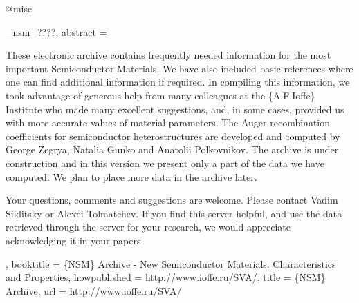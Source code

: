 @misc{_nsm_????,
abstract = {These electronic archive contains frequently needed information for the most important Semiconductor Materials. We have also included basic references where one can find additional information if required. In compiling this information, we took advantage of generous help from many colleagues at the \{A.F.Ioffe\} Institute who made many excellent suggestions, and, in some cases, provided us with more accurate values of material parameters. The Auger recombination coefficients for semiconductor heterostructures are developed and computed by George Zegrya, Natalia Gunko and Anatolii Polkovnikov. The archive is under construction and in this version we present only a part of the data we have computed. We plan to place more data in the archive later.

Your questions, comments and suggestions are welcome. Please contact Vadim Siklitsky or Alexei Tolmatchev. If you find this server helpful, and use the data retrieved through the server for your research, we would appreciate acknowledging it in your papers.},
booktitle = {\{NSM\} Archive - New Semiconductor Materials. Characteristics and Properties},
howpublished = {http://www.ioffe.ru/SVA/},
title = {{\{NSM\} Archive}},
url = {http://www.ioffe.ru/SVA/}
}

